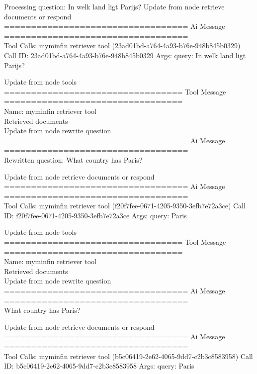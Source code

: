 Processing question: In welk land ligt Parijs?
Update from node retrieve  documents  or  respond
\\[1em]
================================== Ai Message ==================================
\\[1em]
Tool Calls:
myminfin  retriever  tool (23ad01bd-a764-4a93-b76e-948b845b0329)
Call ID: 23ad01bd-a764-4a93-b76e-948b845b0329
Args:
query: In welk land ligt Parijs?



Update from node tools
\\[1em]
================================= Tool Message =================================
\\[1em]
Name: myminfin  retriever  tool
\\[1em]
Retrieved documents
\\[1em]


Update from node rewrite  question
\\[1em]
================================== Ai Message ==================================
\\[1em]

Rewritten question:
What country has Paris?



Update from node retrieve  documents  or  respond
\\[1em]
================================== Ai Message ==================================
\\[1em]
Tool Calls:
myminfin  retriever  tool (f20f7fee-0671-4205-9350-3efb7e72a3ce)
Call ID: f20f7fee-0671-4205-9350-3efb7e72a3ce
Args:
query: Paris



Update from node tools
\\[1em]
================================= Tool Message =================================
\\[1em]
Name: myminfin  retriever  tool
\\[1em]
Retrieved documents
\\[1em]
Update from node rewrite  question
\\[1em]
================================== Ai Message ==================================
\\[1em]

What country has Paris?



Update from node retrieve  documents  or  respond
\\[1em]
================================== Ai Message ==================================
\\[1em]
Tool Calls:
myminfin  retriever  tool (b5c06419-2e62-4065-9dd7-c2b3c8583958)
Call ID: b5c06419-2e62-4065-9dd7-c2b3c8583958
Args:
query: Paris




